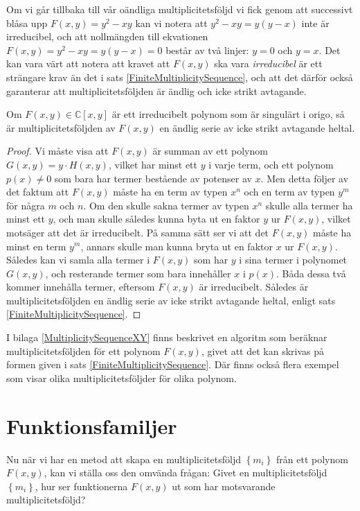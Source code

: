 Om vi går tillbaka till vår oändliga multiplicitetsföljd vi fick genom att successivt blåsa upp $F(x,y)=y^2-xy$ kan vi notera att $y^2-xy=y(y-x)$ inte är irreducibel, och att nollmängden till ekvationen $F(x,y)=y^2-xy=y(y-x)=0$ består av två linjer: $y=0$ och $y=x$. Det kan vara värt att notera att kravet att $F(x,y)$ ska vara \emph{irreducibel} är ett strängare krav än det i sats \ref{FiniteMultiplicitySequence}, och att det därför också garanterar att multiplicitetsföljden är ändlig och icke strikt avtagande.

\begin{Corollary}
Om $F(x,y)\in \mathbb{C}[x,y]$ är ett irreducibelt polynom som är singulärt i origo, så är multiplicitetsföljden av $F(x,y)$ en ändlig serie av icke strikt avtagande heltal.
\end{Corollary}

\begin{proof}
Vi måste visa att $F(x,y)$ är summan av ett polynom $G(x,y)=y\cdot H(x,y)$, vilket har minst ett $y$ i varje term, och ett polynom $p(x) \neq 0$ som bara har termer bestående av potenser av $x$. Men detta följer av det faktum att $F(x,y)$ måste ha en term av typen $x^n$ och en term av typen $y^m$ för några $m$ och $n$. Om den skulle sakna termer av typen $x^n$ skulle alla termer ha minst ett $y$, och man skulle således kunna byta ut en faktor $y$ ur $F(x,y)$, vilket motsäger att det är irreducibelt. På samma sätt ser vi att det $F(x,y)$ måste ha minst en term $y^m$, annars skulle man kunna bryta ut en faktor $x$ ur $F(x,y)$. Således kan vi samla alla termer i $F(x,y)$ som har $y$ i sina termer i polynomet $G(x,y)$, och resterande termer som bara innehåller $x$ i $p(x)$. Båda dessa två kommer innehålla termer, eftersom $F(x,y)$ är irreducibelt. Således är multiplicitetsföljden en ändlig serie av icke strikt avtagande heltal, enligt sats \ref{FiniteMultiplicitySequence}.
\end{proof}

I bilaga \ref{MultiplicitySequenceXY} finns beskrivet en algoritm som beräknar multiplicitetsföljden för ett polynom $F(x,y)$, givet att det kan skrivas på formen given i sats \ref{FiniteMultiplicitySequence}. Där finns också flera exempel som visar olika multiplicitetsföljder för olika polynom.

\section{Funktionsfamiljer}

Nu när vi har en metod att skapa en multiplicitetsföljd $\left\{m_i\right\}$ från ett polynom $F(x,y)$, kan vi ställa oss den omvända frågan: Givet en multiplicitetsföljd $\left\{m_i\right\}$, hur ser funktionerna $F(x,y)$ ut som har motsvarande multiplicitetsföljd?

